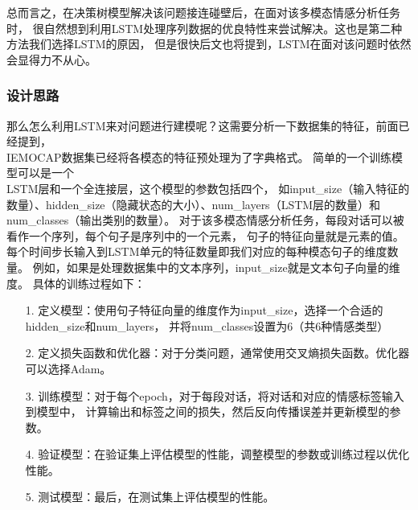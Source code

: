 \documentclass[11pt]{article}
\begin{document}
            总而言之，在决策树模型解决该问题接连碰壁后，在面对该多模态情感分析任务时，
            很自然想到利用LSTM处理序列数据的优良特性来尝试解决。这也是第二种方法我们选择LSTM的原因，
            但是很快后文也将提到，LSTM在面对该问题时依然会显得力不从心。


            \subsubsection{设计思路}
            那么怎么利用LSTM来对问题进行建模呢？这需要分析一下数据集的特征，前面已经提到，\\
            IEMOCAP数据集已经将各模态的特征预处理为了字典格式。
            简单的一个训练模型可以是一个\\LSTM层和一个全连接层，这个模型的参数包括四个，
            如input\_size（输入特征的数量）、hidden\_size（隐藏状态的大小）、num\_layers（LSTM层的数量）和num\_classes（输出类别的数量）。
            对于该多模态情感分析任务，每段对话可以被看作一个序列，每个句子是序列中的一个元素，
            句子的特征向量就是元素的值。每个时间步长输入到LSTM单元的特征数量即我们对应的每种模态句子的维度数量。
            例如，如果是处理数据集中的文本序列，input\_size就是文本句子向量的维度。
            具体的训练过程如下：
            \begin{enumerate}
                \item [1. ]
                定义模型：使用句子特征向量的维度作为input\_size，选择一个合适的hidden\_size和num\_layers，
                并将num\_classes设置为6（共6种情感类型）

                \item [2. ]
                定义损失函数和优化器：对于分类问题，通常使用交叉熵损失函数。优化器可以选择Adam。

                \item [3. ]
                训练模型：对于每个epoch，对于每段对话，将对话和对应的情感标签输入到模型中，
                计算输出和标签之间的损失，然后反向传播误差并更新模型的参数。

                \item [4. ]
                验证模型：在验证集上评估模型的性能，调整模型的参数或训练过程以优化性能。

                \item [5. ]
                测试模型：最后，在测试集上评估模型的性能。

            \end{enumerate}
            
\end{document}
